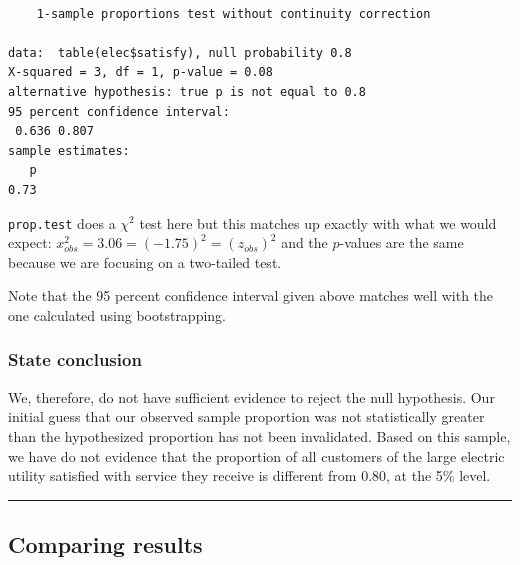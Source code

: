 \documentclass[12pt,]{krantz}
\makeatletter
\newenvironment{Shaded}{\begin{snugshade}}{\end{snugshade}}
\newcommand{\KeywordTok}[1]{\textcolor[rgb]{0.27,0.27,0.27}{\textbf{#1}}}
\newcommand{\DataTypeTok}[1]{\textcolor[rgb]{0.27,0.27,0.27}{#1}}
\newcommand{\FloatTok}[1]{\textcolor[rgb]{0.06,0.06,0.06}{#1}}
\newcommand{\StringTok}[1]{\textcolor[rgb]{0.5,0.5,0.5}{#1}}
\newcommand{\OtherTok}[1]{\textcolor[rgb]{0.37,0.37,0.37}{#1}}
\newcommand{\OperatorTok}[1]{\textcolor[rgb]{0.43,0.43,0.43}{\textbf{#1}}}
\newcommand{\NormalTok}[1]{#1}
\newenvironment{kframe}{%
\medskip{}
\setlength{\fboxsep}{.8em}
 \def\at@end@of@kframe{}%
 \ifinner\ifhmode%
  \def\at@end@of@kframe{\end{minipage}}%
  \begin{minipage}{\columnwidth}%
 \fi\fi%
 \def\FrameCommand##1{\hskip\@totalleftmargin \hskip-\fboxsep
 \colorbox{shadecolor}{##1}\hskip-\fboxsep
     \hskip-\linewidth \hskip-\@totalleftmargin \hskip\columnwidth}%
 \MakeFramed {\advance\hsize-\width
   \@totalleftmargin\z@ \linewidth\hsize
   \@setminipage}}%
 {\par\unskip\endMakeFramed%
 \at@end@of@kframe}
\renewenvironment{Shaded}{\begin{kframe}}{\end{kframe}}
\makeatother
\begin{document}
\begin{Shaded}
\end{Shaded}

\begin{verbatim}

    1-sample proportions test without continuity correction

data:  table(elec$satisfy), null probability 0.8
X-squared = 3, df = 1, p-value = 0.08
alternative hypothesis: true p is not equal to 0.8
95 percent confidence interval:
 0.636 0.807
sample estimates:
   p 
0.73 
\end{verbatim}

\texttt{prop.test} does a \(\chi^2\) test here but this matches up
exactly with what we would expect:
\(x^2_{obs} = 3.06 = (-1.75)^2 = (z_{obs})^2\) and the \(p\)-values are
the same because we are focusing on a two-tailed test.

Note that the 95 percent confidence interval given above matches well
with the one calculated using bootstrapping.

\subsubsection*{State conclusion}\label{state-conclusion-1}


We, therefore, do not have sufficient evidence to reject the null
hypothesis. Our initial guess that our observed sample proportion was
not statistically greater than the hypothesized proportion has not been
invalidated. Based on this sample, we have do not evidence that the
proportion of all customers of the large electric utility satisfied with
service they receive is different from 0.80, at the 5\% level.

\begin{center}\rule{0.5\linewidth}{\linethickness}\end{center}

\subsection{Comparing results}\label{comparing-results-1}
\end{document}

